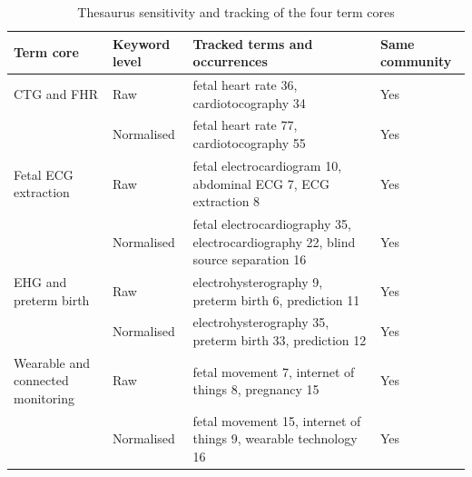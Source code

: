 \begin{table}[!ht]
\caption{Thesaurus sensitivity and tracking of the four term cores}
\centering
\footnotesize
\begin{tabularx}{\textwidth}{@{}L{3.5cm}L{3.3cm}YL{2.2cm}@{}}
\toprule
Term core & Keyword level & Tracked terms and occurrences & Same community \\
\midrule
CTG and FHR & Raw & fetal heart rate 36, cardiotocography 34 & Yes \\
 & Normalised & fetal heart rate 77, cardiotocography 55 & Yes \\
Fetal ECG extraction & Raw & fetal electrocardiogram 10, abdominal ECG 7, ECG extraction 8 & Yes \\
 & Normalised & fetal electrocardiography 35, electrocardiography 22, blind source separation 16 & Yes \\
EHG and preterm birth & Raw & electrohysterography 9, preterm birth 6, prediction 11 & Yes \\
 & Normalised & electrohysterography 35, preterm birth 33, prediction 12 & Yes \\
Wearable and connected monitoring & Raw & fetal movement 7, internet of things 8, pregnancy 15 & Yes \\
 & Normalised & fetal movement 15, internet of things 9, wearable technology 16 & Yes \\
\bottomrule
\end{tabularx}
\end{table}
